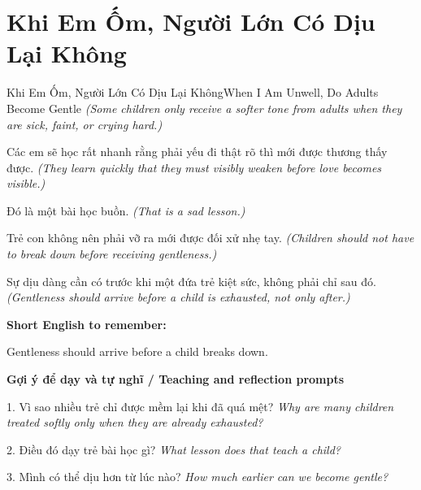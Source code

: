 \section{Khi Em Ốm, Người Lớn Có Dịu Lại Không}
\begin{truyen}{Khi Em Ốm, Người Lớn Có Dịu Lại Không}{When I Am Unwell, Do Adults Become Gentle}
\textit{(Some children only receive a softer tone from adults when they are sick, faint, or crying hard.)}

Các em sẽ học rất nhanh rằng phải yếu đi thật rõ thì mới được thương thấy được.
\textit{(They learn quickly that they must visibly weaken before love becomes visible.)}

Đó là một bài học buồn.
\textit{(That is a sad lesson.)}

Trẻ con không nên phải vỡ ra mới được đối xử nhẹ tay.
\textit{(Children should not have to break down before receiving gentleness.)}

\end{truyen}

\begin{baihoc}
Sự dịu dàng cần có trước khi một đứa trẻ kiệt sức, không phải chỉ sau đó.
\textit{(Gentleness should arrive before a child is exhausted, not only after.)}
\end{baihoc}

\begin{ghinhoanh}
\textbf{Short English to remember:}

Gentleness should arrive before a child breaks down.

\end{ghinhoanh}

\begin{tuhocnhanh}
\textbf{Gợi ý để dạy và tự nghĩ / Teaching and reflection prompts}

1. Vì sao nhiều trẻ chỉ được mềm lại khi đã quá mệt? \textit{Why are many children treated softly only when they are already exhausted?}

2. Điều đó dạy trẻ bài học gì? \textit{What lesson does that teach a child?}

3. Mình có thể dịu hơn từ lúc nào? \textit{How much earlier can we become gentle?}
\end{tuhocnhanh}
\ngancach


